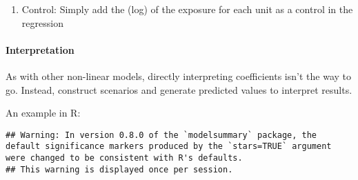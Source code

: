 \documentclass[
]{article}
\newenvironment{Shaded}{\begin{snugshade}}{\end{snugshade}}
\newcommand{\AttributeTok}[1]{\textcolor[rgb]{0.77,0.63,0.00}{#1}}
\newcommand{\CommentTok}[1]{\textcolor[rgb]{0.56,0.35,0.01}{\textit{#1}}}
\newcommand{\ConstantTok}[1]{\textcolor[rgb]{0.00,0.00,0.00}{#1}}
\newcommand{\DecValTok}[1]{\textcolor[rgb]{0.00,0.00,0.81}{#1}}
\newcommand{\FunctionTok}[1]{\textcolor[rgb]{0.00,0.00,0.00}{#1}}
\newcommand{\NormalTok}[1]{#1}
\newcommand{\OtherTok}[1]{\textcolor[rgb]{0.56,0.35,0.01}{#1}}
\newcommand{\SpecialCharTok}[1]{\textcolor[rgb]{0.00,0.00,0.00}{#1}}
\newcommand{\StringTok}[1]{\textcolor[rgb]{0.31,0.60,0.02}{#1}}
\providecommand{\tightlist}{%
  \setlength{\itemsep}{0pt}\setlength{\parskip}{0pt}}
\begin{document}
\begin{enumerate}
\def\labelenumi{\arabic{enumi}.}
\setcounter{enumi}{1}
\tightlist
\item
  Control: Simply add the (log) of the exposure for each unit as a
  control in the regression
\end{enumerate}

\hypertarget{interpretation-1}{%
\paragraph{Interpretation}\label{interpretation-1}}

As with other non-linear models, directly interpreting coefficients
isn't the way to go. Instead, construct scenarios and generate predicted
values to interpret results.

An example in R:

\begin{Shaded}
\end{Shaded}

\begin{verbatim}
## Warning: In version 0.8.0 of the `modelsummary` package, the default significance markers produced by the `stars=TRUE` argument were changed to be consistent with R's defaults.
## This warning is displayed once per session.
\end{verbatim}
\end{document}
